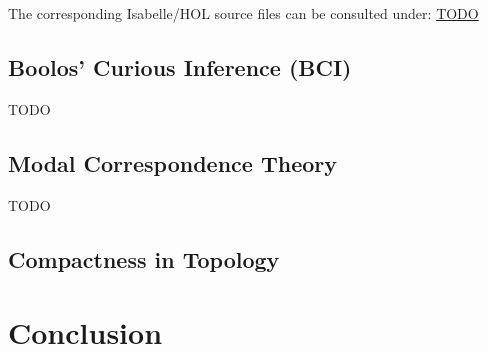 \documentclass{article}
\begin{document}
The corresponding Isabelle/HOL source files can be consulted under: \url{TODO}

\subsection{Boolos' Curious Inference (BCI)}
TODO

\subsection{Modal Correspondence Theory}
TODO
\subsection{Compactness in Topology}

\section{Conclusion}







 

\end{document}
